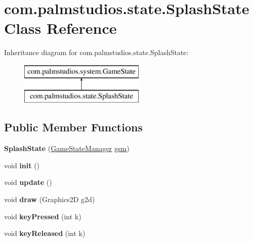 \hypertarget{classcom_1_1palmstudios_1_1state_1_1_splash_state}{}\section{com.\+palmstudios.\+state.\+Splash\+State Class Reference}
\label{classcom_1_1palmstudios_1_1state_1_1_splash_state}
Inheritance diagram for com.\+palmstudios.\+state.\+Splash\+State\+:\begin{figure}[H]
\begin{center}
\leavevmode
\includegraphics[height=2.000000cm]{classcom_1_1palmstudios_1_1state_1_1_splash_state}
\end{center}
\end{figure}
\subsection*{Public Member Functions}
\begin{DoxyCompactItemize}
\item 
\mbox{\label{classcom_1_1palmstudios_1_1state_1_1_splash_state_aa74bd48852527747e1c4daa2464ed498}} 
{\bfseries Splash\+State} (\hyperlink{classcom_1_1palmstudios_1_1state_1_1_game_state_manager}{Game\+State\+Manager} \hyperlink{classcom_1_1palmstudios_1_1system_1_1_game_state_a3a9b05fb9a962eabae260371069a79eb}{gsm})
\item 
\mbox{\label{classcom_1_1palmstudios_1_1state_1_1_splash_state_a972467b8c9bb72876e1fe4d3b3ff04b5}} 
void {\bfseries init} ()
\item 
\mbox{\label{classcom_1_1palmstudios_1_1state_1_1_splash_state_a2fd693ce5dd6815a66ef706e1c6fa534}} 
void {\bfseries update} ()
\item 
\mbox{\label{classcom_1_1palmstudios_1_1state_1_1_splash_state_a2df720e5ef6635be95b55029989fc12a}} 
void {\bfseries draw} (Graphics2D g2d)
\item 
\mbox{\label{classcom_1_1palmstudios_1_1state_1_1_splash_state_a298b52ade3189f2586db498eea1e6239}} 
void {\bfseries key\+Pressed} (int k)
\item 
\mbox{\label{classcom_1_1palmstudios_1_1state_1_1_splash_state_adb8330cea437cb3647504447393d9da8}} 
void {\bfseries key\+Released} (int k)
\end{DoxyCompactItemize}
